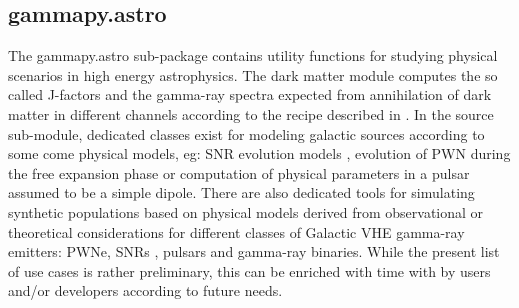 \subsection{gammapy.astro}
\label{ssec:gammapy-astro}

The gammapy.astro sub-package contains utility functions for studying physical scenarios in high energy astrophysics.
The dark matter module computes the so called J-factors and the gamma-ray spectra expected from annihilation of dark matter in different channels according to the recipe described in \cite{2011JCAP...03..051C}. In the source sub-module, dedicated classes exist for modeling galactic sources according to some come physical models, eg: SNR evolution models \citep{1950RSPSA.201..159T, 1999ApJS..120..299T}, evolution of PWN during the free expansion phase \citep{2006ARA&A..44...17G} or computation of physical parameters in a pulsar assumed to be a simple dipole. There are also dedicated tools for simulating synthetic populations based on physical models derived from observational or theoretical considerations for different classes of Galactic VHE gamma-ray emitters: PWNe, SNRs \cite{1998ApJ...504..761C}, pulsars \cite{2006ApJ...643..332F, 2006MNRAS.372..777L, 2004A&A...422..545Y} and gamma-ray binaries. While the present list of use cases is rather preliminary, this can be enriched with time with by users and/or developers according to future needs.